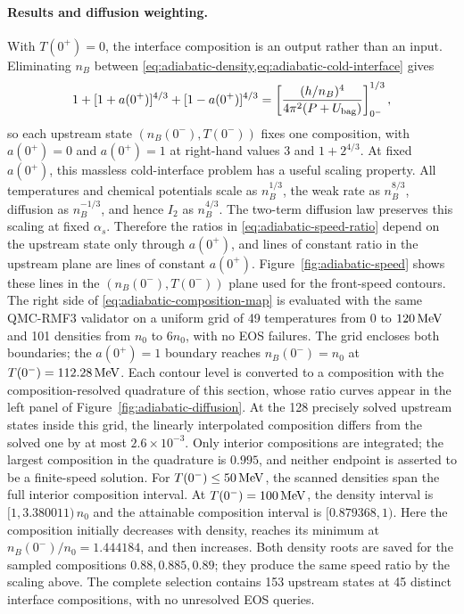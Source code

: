 \paragraph{Results and diffusion weighting.}
With \(T(0^+)=0\), the interface composition is an output rather than an input.
Eliminating \(n_B\) between \cref{eq:adiabatic-density,eq:adiabatic-cold-interface} gives
\begin{equation}
 1+[1+a(0^+)]^{4/3}+[1-a(0^+)]^{4/3}
 =\left[\frac{(h/n_B)^4}{4\pi^2(P+U_{\rm bag})}\right]^{1/3}_{0^-},
 \label{eq:adiabatic-composition-map}
\end{equation}
so each upstream state \((n_B(0^-),T(0^-))\) fixes one composition, with \(a(0^+)=0\) and \(a(0^+)=1\) at right-hand values \(3\) and \(1+2^{4/3}\).
At fixed \(a(0^+)\), this massless cold-interface problem has a useful scaling property.
All temperatures and chemical potentials scale as \(n_B^{1/3}\), the weak rate as \(n_B^{8/3}\), diffusion as \(n_B^{-1/3}\), and hence \(I_2\) as \(n_B^{4/3}\).
The two-term diffusion law preserves this scaling at fixed \(\alpha_s\).
Therefore the ratios in \cref{eq:adiabatic-speed-ratio} depend on the upstream state only through \(a(0^+)\), and lines of constant ratio in the upstream plane are lines of constant \(a(0^+)\).
Figure~\ref{fig:adiabatic-speed} shows these lines in the \((n_B(0^-),T(0^-))\) plane used for the front-speed contours.
The right side of \cref{eq:adiabatic-composition-map} is evaluated with the same QMC-RMF3 validator on a uniform grid of 49 temperatures from \(0\) to \(120\,\mathrm{MeV}\) and 101 densities from \(n_0\) to \(6n_0\), with no EOS failures.
The grid encloses both boundaries; the \(a(0^+)=1\) boundary reaches \(n_B(0^-)=n_0\) at \(T(0^-)=112.28\,\mathrm{MeV}\).
Each contour level is converted to a composition with the composition-resolved quadrature of this section, whose ratio curves appear in the left panel of Figure~\ref{fig:adiabatic-diffusion}.
At the 128 precisely solved upstream states inside this grid, the linearly interpolated composition differs from the solved one by at most \(2.6\times10^{-3}\).
Only interior compositions are integrated; the largest composition in the quadrature is \(0.995\), and neither endpoint is asserted to be a finite-speed solution.
For \(T(0^-)\leq50\,\mathrm{MeV}\), the scanned densities span the full interior composition interval.
At \(T(0^-)=100\,\mathrm{MeV}\), the density interval is \([1,3.380011)\,n_0\) and the attainable composition interval is \([0.879368,1)\).
Here the composition initially decreases with density, reaches its minimum at \(n_B(0^-)/n_0=1.444184\), and then increases.
Both density roots are saved for the sampled compositions \(0.88,0.885,0.89\); they produce the same speed ratio by the scaling above.
The complete selection contains 153 upstream states at 45 distinct interface compositions, with no unresolved EOS queries.
\par


